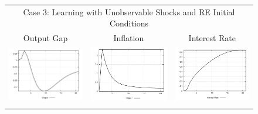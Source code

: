 \begin{figure}
\begin{tabular}{ccc}
\multicolumn{3}{c}{Case 3: Learning with Unobservable Shocks and RE Initial Conditions}\\
Output Gap & Inflation & Interest Rate \\ 
\includegraphics[scale=0.28]{results_reinit/Output_costshock_irf.png} & 
\includegraphics[scale=0.28]{results_reinit/Inflation_costshock_irf.png} & 
\includegraphics[scale=0.28]{results_reinit/Interest_Rate_costshock_irf.png} \\ \\ 

\end{tabular}
\end{figure}

